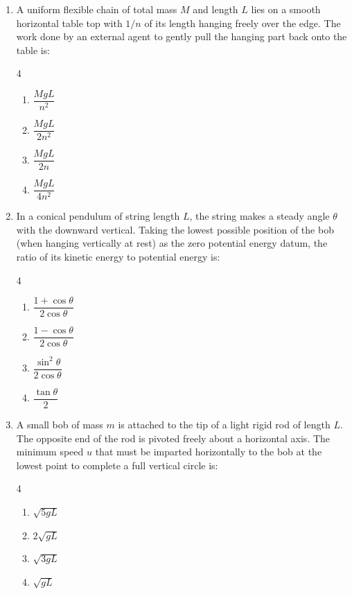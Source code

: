 \documentclass[11pt,a4paper]{article}
\begin{document}
\begin{enumerate}[label=\textbf{\arabic*.},leftmargin=18pt,itemsep=8pt,resume]
  \item A uniform flexible chain of total mass $M$ and length $L$ lies on a smooth horizontal table top with $1/n$ of its length hanging freely over the edge. The work done by an external agent to gently pull the hanging part back onto the table is:
  \begin{multicols}{4}
    \begin{enumerate}[label=(\Alph*)]
      \item $\dfrac{MgL}{n^2}$
      \item $\dfrac{MgL}{2n^2}$
      \item $\dfrac{MgL}{2n}$
      \item $\dfrac{MgL}{4n^2}$
    \end{enumerate}
  \end{multicols}

  \item In a conical pendulum of string length $L$, the string makes a steady angle $\theta$ with the downward vertical. Taking the lowest possible position of the bob (when hanging vertically at rest) as the zero potential energy datum, the ratio of its kinetic energy to potential energy is:
  \begin{multicols}{4}
    \begin{enumerate}[label=(\Alph*)]
      \item $\dfrac{1 + \cos\theta}{2\cos\theta}$
      \item $\dfrac{1 - \cos\theta}{2\cos\theta}$
      \item $\dfrac{\sin^2\theta}{2\cos\theta}$
      \item $\dfrac{\tan\theta}{2}$
    \end{enumerate}
  \end{multicols}

  \item A small bob of mass $m$ is attached to the tip of a light rigid rod of length $L$. The opposite end of the rod is pivoted freely about a horizontal axis. The minimum speed $u$ that must be imparted horizontally to the bob at the lowest point to complete a full vertical circle is:
  \begin{multicols}{4}
    \begin{enumerate}[label=(\Alph*)]
      \item $\sqrt{5gL}$
      \item $2\sqrt{gL}$
      \item $\sqrt{3gL}$
      \item $\sqrt{gL}$
    \end{enumerate}
  \end{multicols}


\end{enumerate}
\end{document}
